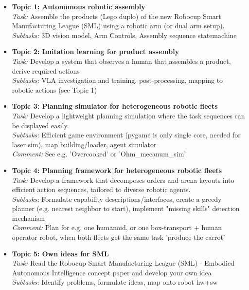 \documentclass{ohm_project_description}
\begin{document}
\begin{itemize}[leftmargin=0.5cm]
    \setlength\itemsep{.5em}
    \item \textbf{Topic 1: Autonomous robotic assembly} \\
        \textit{Task:} Assemble the products (Lego duplo) of the new Robocup Smart Manufacturing League (SML) using a robotic arm (or dual arm setup). \\
        \textit{Subtasks:} 3D vision model, Arm Controls, Assembly sequence statemachine

    \item \textbf{Topic 2: Imitation learning for product assembly} \\
        \textit{Task:} Develop a system that observes a human that assembles a product, derive required actions \\
        \textit{Subtasks:} VLA investigation and training, post-processing, mapping to robotic actions (see Topic 1)

    \item \textbf{Topic 3: Planning simulator for heterogeneous robotic fleets} \\
        \textit{Task:} Develop a lightweight planning simulation where the task sequences can be displayed easily. \\
        \textit{Subtasks:} Efficient game environment (pygame is only single core, needed for laser sim), map building/loader, agent simulator \\
        \textit{Comment:} See e.g. 'Overcooked' or 'Ohm\_mecanum\_sim'

    \item \textbf{Topic 4: Planning framework for heterogeneous robotic fleets} \\
        \textit{Task:} Develop a framework that decomposes orders and arena layouts into efficient action sequences, tailored to diverse robotic agents. \\
        \textit{Subtasks:} Formulate capability descriptions/interfaces, create a greedy planner (e.g. nearest neighbor to start), implement "missing skills" detection mechanism \\
        \textit{Comment:} Plan for e.g. one humanoid, or one box-transport + human operator robot, when both fleets get the same task 'produce the carrot'

    \item \textbf{Topic 5: Own ideas for SML} \\
        \textit{Task:} Read the Robocup Smart Manufacturing League (SML) - Embodied Autonomous Intelligence concept paper and develop your own idea \\
        \textit{Subtasks:} Identify problems, formulate ideas, map onto robot hw+sw
\end{itemize}
\end{document}
